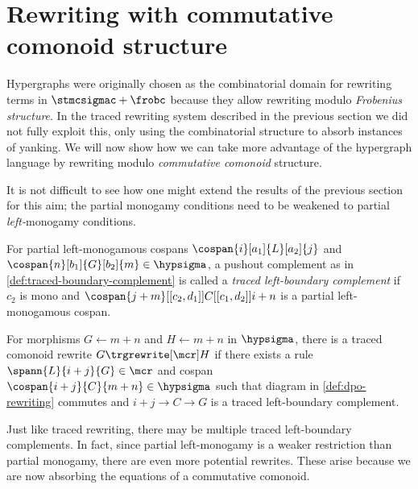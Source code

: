 \section{Rewriting with commutative comonoid structure}

Hypergraphs were originally chosen as the combinatorial domain for rewriting
terms in \(\stmcsigmac + \frobc\) because they allow rewriting modulo
\emph{Frobenius structure}.
In the traced rewriting system described in the previous section we did not
fully exploit this, only using the combinatorial structure to absorb instances
of yanking.
We will now show how we can take more advantage of the hypergraph language by
rewriting  modulo \emph{commutative comonoid} structure.

It is not difficult to see how one might extend the results of the previous
section for this aim; the partial monogamy conditions need to be weakened to
partial \emph{left-}monogamy conditions.

\begin{definition}
    \label{def:traced-left-boundary-complement}
    For partial left-monogamous cospans \(
    \cospan{i}[a_1]{L}[a_2]{j}
    \) and \(
    \cospan{n}[b_1]{G}[b_2]{m} \in \hypsigma
    \), a pushout complement as in \cref{def:traced-boundary-complement}
    is called a \emph{traced left-boundary complement} if \(c_2\)
    is mono and \(
    \cospan{j + m}[[c_2,d_1]]{C}[[c_1,d_2]]{{i + n}}
    \) is a partial left-monogamous cospan.
\end{definition}

\begin{definition}
    For morphisms \(G \leftarrow m+n\) and \(H \leftarrow m+n\) in
    \(\hypsigma\), there is a traced comonoid rewrite \(G \trgrewrite[\mcr] H\)
    if there exists a rule \(
    \spann{L}{i + j}{G} \in \mcr
    \) and cospan \(
    \cospan{i + j}{C}{m + n} \in \hypsigma
    \) such that diagram in \cref{def:dpo-rewriting} commutes and
    \(i + j \to C \to G\) is a
    traced left-boundary complement.
\end{definition}

Just like traced rewriting, there may be multiple traced left-boundary
complements.
In fact, since partial left-monogamy is a weaker restriction than partial
monogamy, there are even more potential rewrites.
These arise because we are now absorbing the equations of a commutative
comonoid.

